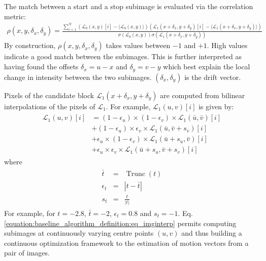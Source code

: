 \documentclass[letterpaper,10pt,english]{jupyterBook}
\begin{document}
\sphinxAtStartPar
The match between a start and a stop sub\sphinxhyphen{}image is evaluated via the correlation metric:
\begin{equation}\label{equation:baseline_algorithm_definition:eq_rho}
\begin{split}
\rho(x,y,\delta_x,\delta_y) =
\frac{
\sum_{i=1}^{N} (\mathcal{L}_0(x,y)[i]-\langle \mathcal{L}_0(x,y) \rangle) (\mathcal{L}_1(x+\delta_x,y+\delta_y)[i]-\langle \mathcal{L}_1(x+\delta_x,y+\delta_y) \rangle)
}{\sigma ( \mathcal{L}_0(x,y) ) \sigma ( \mathcal{L}_1(x+\delta_x,y+\delta_y) )}
\end{split}
\end{equation}
\sphinxAtStartPar
By construction, \(\rho(x,y,\delta_x,\delta_y)\) takes
values between \(-1\) and \(+1\). High values indicate a good match between
the sub\sphinxhyphen{}images. This is further interpreted as having found the offsets
\(\delta_x = u - x\) and \(\delta_y = v - y\) which best explain the local
change in intensity between the two sub\sphinxhyphen{}images. \((\delta_x,\delta_y)\) is
the drift vector.

\sphinxAtStartPar
Pixels of the candidate block \(\mathcal{L}_1(x+\delta_x,y+\delta_y)\) are
computed from bi\sphinxhyphen{}linear interpolations of the pixels of \(\mathcal{L}_1\).
For example, \(\mathcal{L}_1(u,v)[i]\) is given by:
\begin{equation}\label{equation:baseline_algorithm_definition:eq_imginterp}
\begin{split}
\begin{split}
\mathcal{L}_1(u,v)[i] & = (1 - \epsilon_{u}) \times (1 - \epsilon_{v}) \times \mathcal{L}_1(\bar{u},\bar{v})[i] \\
        &+  (1 - \epsilon_{u}) \times \epsilon_{v} \times  \mathcal{L}_1(\bar{u},\bar{v}+s_{v})[i] \\
        &+ \epsilon_{u} \times (1 - \epsilon_{v}) \times  \mathcal{L}_1(\bar{u}+s_{u},\bar{v})[i] \\
        &+ \epsilon_{u} \times \epsilon_{v} \times \mathcal{L}_1(\bar{u}+s_{u},\bar{v}+s_{v})[i]
\end{split}
\end{split}
\end{equation}
\sphinxAtStartPar
where
\begin{equation*}
\begin{split}
\begin{aligned}
\bar{t} & = & \operatorname{Trunc}(t) \\
\epsilon_t & = & |t - \bar{t}| \\
s_t        & = & \frac{t}{|t|}
\end{aligned}
\end{split}
\end{equation*}
\sphinxAtStartPar
For example, for \(t=-2.8\), \(\bar{t}=-2\), \(\epsilon_t=0.8\) and \(s_t=-1\). Eq. \eqref{equation:baseline_algorithm_definition:eq_imginterp} permits computing 
sub\sphinxhyphen{}images at continuously varying centre points \((u,v)\) and thus building a continuous optimization framework to the estimation of motion
vectors from a pair of images.
\end{document}
